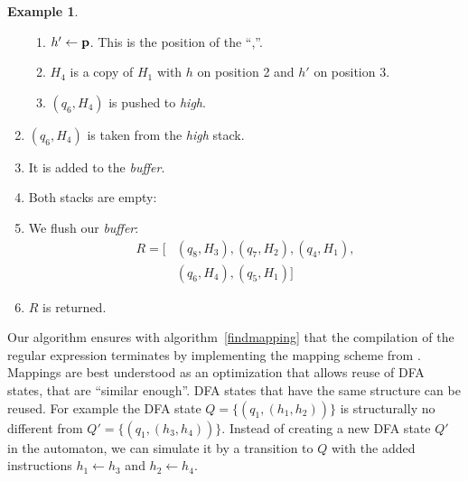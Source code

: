 \documentclass[english]{sigplanconf}
\theoremstyle{definition}
\newtheorem{example}{Example}[section]
\begin{document}
\begin{example}
\begin{enumerate}
\begin{enumerate}
	\item $h'\leftarrow\mathbf{\mathbf{p}}$. This is the position of the ``,''.
	\item $H_4$ is a copy of $H_1$ with $h$ on position 2 and $h'$ on position 3.
	\item $(q_6, H_4)$ is pushed to \emph{high}.
\end{enumerate}
\item $(q_6, H_4)$ is taken from the \emph{high} stack.
\item It is added to the \emph{buffer}.
\item Both stacks are empty:
\item We flush our \emph{buffer}: 
\begin{align*}
R=[&(q_8, H_3), (q_7, H_2), (q_4, H_1),\\ &(q_6, H_4), (q_5, H_1)]
\end{align*}
\item $R$ is returned.
\end{enumerate}
\end{example}

Our algorithm ensures with algorithm~\ref{findmapping} that the 
compilation of the regular expression terminates by implementing 
the mapping scheme from \cite{Laur00a}. 
Mappings are best understood as an optimization that allows reuse
of DFA states, that are ``similar enough''. DFA states that have the 
same structure can be reused. For example the DFA state 
$Q=\{(q_1, (h_1, h_2))\}$ is structurally no different from 
$Q'=\{(q_1, (h_3, h_4))\}$. Instead of creating a new DFA state $Q'$ 
in the automaton, we can simulate it by a transition to $Q$ with the
added instructions $h_1\leftarrow h_3$ and $h_2 \leftarrow h_4$.
\end{document}
